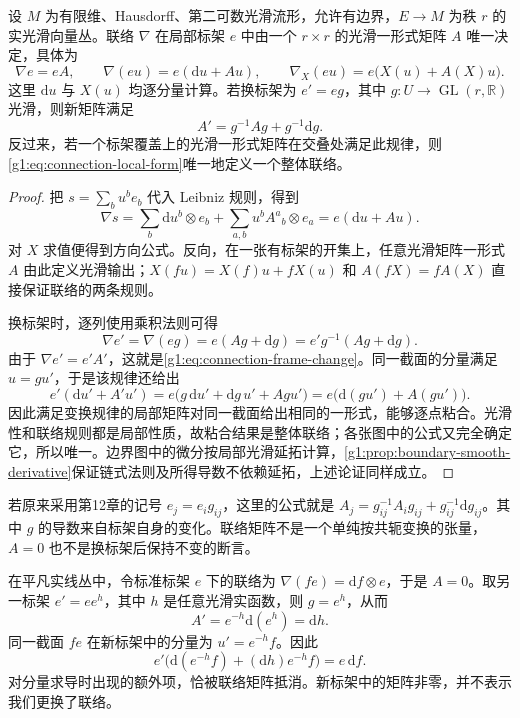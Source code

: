 \begin{proposition}\label{g1:prop:connection-local-data}
	设 \(M\) 为有限维、Hausdorff、第二可数光滑流形，允许有边界，\(E\to M\) 为秩 \(r\) 的实光滑向量丛。联络 \(\nabla\) 在局部标架 \(e\) 中由一个 \(r\times r\) 的光滑一形式矩阵 \(A\) 唯一决定，具体为
	\begin{equation}
		\label{g1:eq:connection-local-form}
		\nabla e=eA,\qquad
		\nabla(eu)=e(\mathrm{d}u+A u),\qquad
		\nabla_X(eu)=e\bigl(X(u)+A(X)u\bigr).
	\end{equation}
	这里 \(\mathrm{d}u\) 与 \(X(u)\) 均逐分量计算。若换标架为 \(e'=eg\)，其中 \(g:U\to\operatorname{GL}(r,\mathbb R)\) 光滑，则新矩阵满足
	\begin{equation}
		\label{g1:eq:connection-frame-change}
		A'=g^{-1}Ag+g^{-1}\mathrm{d}g.
	\end{equation}
	反过来，若一个标架覆盖上的光滑一形式矩阵在交叠处满足此规律，则\eqref{g1:eq:connection-local-form}唯一地定义一个整体联络。
\end{proposition}
\begin{proof}
	把 \(s=\sum_bu^b e_b\) 代入 Leibniz 规则，得到
	\[
		\nabla s=\sum_b\mathrm{d}u^b\otimes e_b+\sum_{a,b}u^bA^a{}_b\otimes e_a
		=e(\mathrm{d}u+A u).
	\]
	对 \(X\) 求值便得到方向公式。反向，在一张有标架的开集上，任意光滑矩阵一形式 \(A\) 由此定义光滑输出；\(X(fu)=X(f)u+fX(u)\) 和 \(A(fX)=fA(X)\) 直接保证联络的两条规则。

	换标架时，逐列使用乘积法则可得
	\[
		\nabla e'=\nabla(eg)=e(Ag+\mathrm{d}g)=e'g^{-1}(Ag+\mathrm{d}g).
	\]
	由于 \(\nabla e'=e'A'\)，这就是\eqref{g1:eq:connection-frame-change}。同一截面的分量满足 \(u=gu'\)，于是该规律还给出
	\[
		e'(\mathrm{d}u'+A'u')
		=e\bigl(g\,\mathrm{d}u'+\mathrm{d}g\,u'+Ag u'\bigr)
		=e\bigl(\mathrm{d}(gu')+A(gu')\bigr).
	\]
	因此满足变换规律的局部矩阵对同一截面给出相同的一形式，能够逐点粘合。光滑性和联络规则都是局部性质，故粘合结果是整体联络；各张图中的公式又完全确定它，所以唯一。边界图中的微分按局部光滑延拓计算，\cref{g1:prop:boundary-smooth-derivative}保证链式法则及所得导数不依赖延拓，上述论证同样成立。
\end{proof}

若原来采用第12章的记号 \(e_j=e_i g_{ij}\)，这里的公式就是 \(A_j=g_{ij}^{-1}A_i g_{ij}+g_{ij}^{-1}\mathrm{d}g_{ij}\)。其中 \(g\) 的导数来自标架自身的变化。联络矩阵不是一个单纯按共轭变换的张量，\(A=0\) 也不是换标架后保持不变的断言。

\begin{example}
	在平凡实线丛中，令标准标架 \(e\) 下的联络为 \(\nabla(fe)=\mathrm{d}f\otimes e\)，于是 \(A=0\)。取另一标架 \(e'=e e^h\)，其中 \(h\) 是任意光滑实函数，则 \(g=e^h\)，从而
	\[
		A'=e^{-h}\mathrm{d}(e^h)=\mathrm{d}h.
	\]
	同一截面 \(fe\) 在新标架中的分量为 \(u'=e^{-h}f\)。因此
	\[
		e'\bigl(\mathrm{d}(e^{-h}f)+(\mathrm{d}h)e^{-h}f\bigr)=e\,\mathrm{d}f.
	\]
	对分量求导时出现的额外项，恰被联络矩阵抵消。新标架中的矩阵非零，并不表示我们更换了联络。
\end{example}


